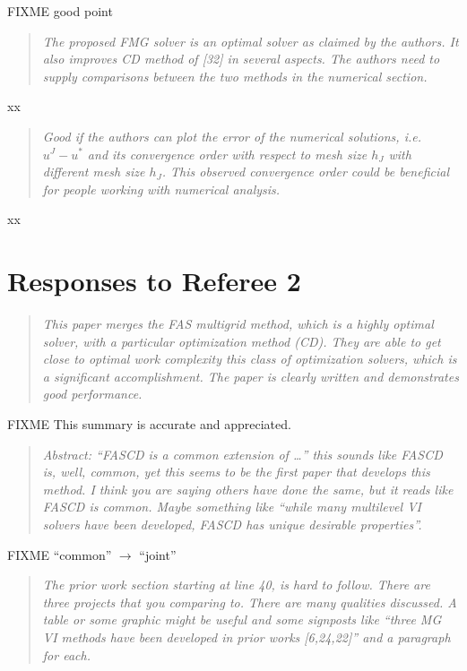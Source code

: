 \documentclass[letterpaper,final,12pt,reqno]{amsart}
\newenvironment{review}%
{\bigskip \par \begin{quote} \selectfont \sl}%
{\end{quote}}
\newcommand\short[1]{\medskip\noindent #1}   %
\newenvironment{response}%
{\medskip\noindent}%
{}
\begin{document}
\begin{response}
FIXME good point
\end{response}


\begin{review}
The proposed FMG solver is an optimal solver as claimed by the authors. It also improves CD method of [32] in several aspects. The authors need to supply comparisons between the two methods in the numerical section.
\end{review}

\short{xx}

\begin{review}
Good if the authors can plot the error of the numerical solutions, i.e. $u^J - u^*$ and its convergence order with respect to mesh size $h_J$ with different mesh size $h_J$. This observed convergence order could be beneficial for people working with numerical analysis.
\end{review}

\short{xx}


\section{Responses to Referee 2}

\begin{review}
This paper merges the FAS multigrid method, which is a highly optimal solver, with a particular optimization method (CD).  They are able to get close to optimal work complexity this class of optimization solvers, which is a significant accomplishment.  The paper is clearly written and demonstrates good performance.
\end{review}

\short{FIXME This summary is accurate and appreciated.}

\begin{review}
Abstract: ``FASCD is a common extension of \dots'' this sounds like FASCD is, well, common, yet this seems to be the first paper that develops this method.  I think you are saying others have done the same, but it reads like FASCD is common.  Maybe something like ``while many multilevel VI solvers have been developed, FASCD has unique desirable properties''.
\end{review}

\short{FIXME ``common'' $\to$ ``joint''}

\begin{review}
The prior work section starting at line 40, is hard to follow.  There are three projects that you comparing to.  There are many qualities discussed.  A table or some graphic might be useful and some signposts like ``three MG VI methods have been developed in prior works [6,24,22]'' and a paragraph for each.
\end{review}
\end{document}
